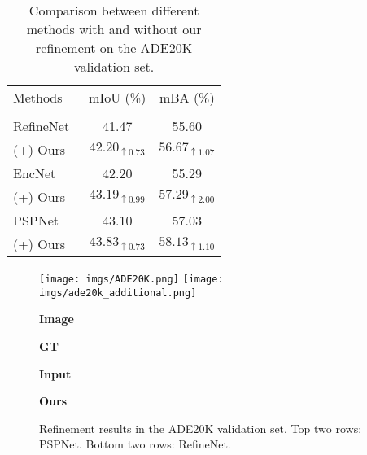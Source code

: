 \documentclass[10pt,twocolumn,letterpaper]{article}
\begin{document}
\begin{table}[t]
	\centering
	\begin{tabular}{l|c|c}
		Methods & mIoU (\%) & mBA (\%) \\
		\hhline{|=|=|=|} 
		\multicolumn{3}{c}{\textbf{ADE20K}} \\
		\Xhline{2\arrayrulewidth}
		RefineNet~\cite{lin2017refinenet} & 41.47 & 55.60 \\
		\quad (+) Ours & $\mathbf{42.20_{\uparrow0.73}}$ & $\mathbf{56.67_{\uparrow1.07}}$ \\
		\hline
		EncNet~\cite{zhang2018context} & 42.20 & 55.29 \\
		\quad (+) Ours & $\mathbf{43.19_{\uparrow0.99}}$ & $\mathbf{57.29_{\uparrow2.00}}$ \\
		\hline
		PSPNet~\cite{zhao2017pyramid} & 43.10  & 57.03  \\
		\quad (+) Ours & $\mathbf{43.83_{\uparrow0.73}}$ & $\mathbf{58.13_{\uparrow1.10}}$ \\
	\end{tabular}
    \caption{Comparison between different methods with and without our refinement on the ADE20K validation set.}
	\label{tab:multiclass_table}
	\vspace{-0.2in}
\end{table}

\begin{figure}[h]
\centering
{}
\centering
	\texttt{[image: imgs/ADE20K.png]}
	\texttt{[image: imgs/ade20k\_additional.png]}
    	\begin{center}
        	\textbf{Image}
    	\end{center}
	\endminipage\hfill
    	\begin{center}
        	\textbf{GT}
    	\end{center}
	\endminipage\hfill
    	\begin{center}
        	\textbf{Input}
    	\end{center}
	\endminipage\hfill
    	\begin{center}
        	\textbf{Ours}
    	\end{center}
	\endminipage\hfill
\endminipage
\vspace{0.05in}
\caption{Refinement results in the ADE20K validation set. 
    Top two rows: PSPNet. Bottom two rows: RefineNet.}
\label{fig:ade_fine_results}
\vspace{-0.25in}
\end{figure}
\end{document}
